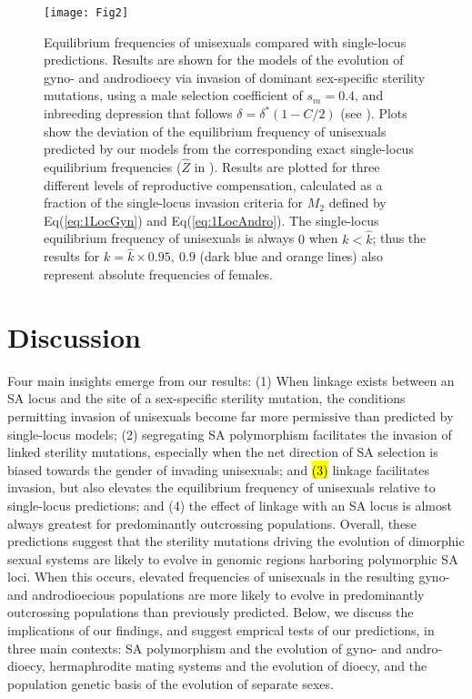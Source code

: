 \documentclass[9pt,twocolumn,twoside,lineno]{gsajnl}
\begin{document}
\begin{figure}[htbp]
\centering
\texttt{[image: Fig2]}
\caption{Equilibrium frequencies of unisexuals compared with single-locus predictions. Results are shown for the models of the evolution of gyno- and androdioecy via invasion of dominant sex-specific sterility mutations, using a male selection coefficient of $s_m = 0.4$, and inbreeding depression that follows $\delta = \delta^\ast(1 - C/2)$ (see ). Plots show the deviation of the equilibrium frequency of unisexuals predicted by our models from the corresponding exact single-locus equilibrium frequencies ($\hat{Z}$ in \citealt{Charlesworth1978a}). Results are plotted for three different levels of reproductive compensation, calculated as a fraction of the single-locus invasion criteria for $M_2$ defined by Eq(\ref{eq:1LocGyn}) and Eq(\ref{eq:1LocAndro}). The single-locus equilibrium frequency of unisexuals is always $0$ when $k < \hat{k}$; thus the results for $k = \hat{k} \times 0.95,~0.9$ (dark blue and orange lines) also represent absolute frequencies of females.}
\label{fig:eqFreq}
\end{figure}


\section{Discussion}

Four main insights emerge from our results: (1) When linkage exists between an SA locus and the site of a sex-specific sterility mutation, the conditions permitting invasion of unisexuals become far more permissive than predicted by single-locus models; (2) segregating SA polymorphism facilitates the invasion of linked sterility mutations, especially when the net direction of SA selection is biased towards the gender of invading unisexuals; and \hl{(3)} linkage facilitates invasion, but also elevates the equilibrium frequency of unisexuals relative to single-locus predictions; and (4) the effect of linkage with an SA locus is almost always greatest for predominantly outcrossing populations. Overall, these predictions suggest that the sterility mutations driving the evolution of dimorphic sexual systems are likely to evolve in genomic regions harboring polymorphic SA loci. When this occurs, elevated frequencies of unisexuals in the resulting gyno- and androdioecious populations are more likely to evolve in predominantly outcrossing populations than previously predicted. Below, we discuss the implications of our findings, and suggest emprical tests of our predictions, in three main contexts: SA polymorphism and the evolution of gyno- and andro-dioecy, hermaphrodite mating systems and the evolution of dioecy, and the population genetic basis of the evolution of separate sexes.
\end{document}
